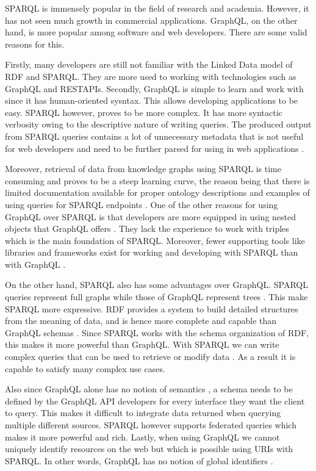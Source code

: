 SPARQL is immensely popular in the field of research and academia. However, it has not seen much growth in commercial applications. GraphQL, on the other hand, is more popular among software and web developers. There are some valid reasons for this.  

Firstly, many developers are still not familiar with the Linked Data model of RDF and SPARQL. They are more used to working with technologies such as GraphQL and RESTAPIs. Secondly, GraphQL is simple to learn and work with since it has human-oriented sysntax. This allows developing applications to be easy.  SPARQL however, proves to be more complex. It has more syntactic verbosity owing to the descriptive nature of writing queries. The produced output from SPARQL queries contains a lot of unnecessary metadata that is not useful for web developers and need to be further parsed for using in web applications \cite{Lisena2018}.

Moreover, retrieval of data from knowledge graphs using SPARQL is time consuming and proves to be a steep learning curve, the reason being that there is limited documentation available for proper ontology descriptions and examples of using queries for SPARQL endpoints \cite{Angele2022}. One of the other reasons for using GraphQL over SPARQL is that developers are more equipped in using nested objects that GraphQL offers \cite{Taelman2018}. They lack the experience to work with triples which is the main foundation of SPARQL. Moreover, fewer supporting tools like libraries and frameworks exist for working and developing with SPARQL than with GraphQL \cite{Taelman2018}. 

On the other hand, SPARQL also has some advantages over GraphQL. SPARQL queries represent full graphs while those of GraphQL represent trees \cite{Taelman2018}. This make SPARQL more expressive. RDF provides a system to build detailed structures from the meaning of data, and is hence more complete and capable than GraphQL schemas \cite{Dresslar2019}. Since SPARQL works with the schema organization of RDF, this makes it more powerful than GraphQL. With SPARQL we can write complex queries that can be used to retrieve or modify data \cite{Angele2022}. As a result it is capable to satisfy many complex use cases.

Also since GraphQL alone has no notion of semantics \cite{Taelman2018}, a schema needs to be defined by the GraphQL API developers for every interface they want the client to query. This makes it difficult to integrate data returned when querying multiple different sources. SPARQL however supports federated queries which makes it more powerful and rich. Lastly, when using GraphQL we cannot uniquely identify resources on the web but which is possible using URIs with SPARQL. In other words, GraphQL has no notion of global identifiers \cite{Taelman2018}.
